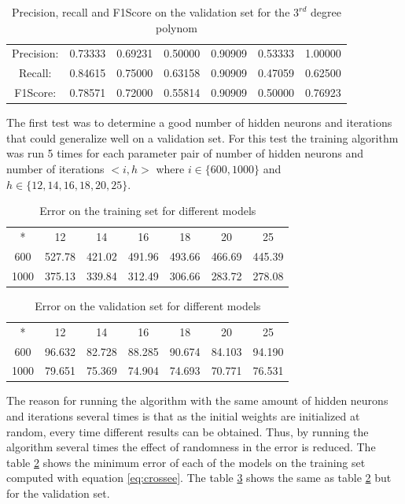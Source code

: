 \documentclass{IEEEtran}
\begin{document}
\begin{table}
\centering
\begin{tabular}{|c|c|c|c|c|c|c|}
\hline
Precision: & 0.73333 & 0.69231 & 0.50000 & 0.90909 & 0.53333 & 1.00000 \\
Recall: &  0.84615 & 0.75000 & 0.63158 & 0.90909 & 0.47059 & 0.62500 \\
F1Score: & 0.78571 & 0.72000 & 0.55814 & 0.90909 & 0.50000 & 0.76923 \\
\hline
\end{tabular}
\caption{Precision, recall and F1Score on the validation set for the $3^{rd}$ degree polynom}
\label{tb:tscoreslr}
\end{table}



The first test was to determine a good number of hidden neurons and iterations that could generalize well
on a validation set. For this test the training algorithm was run 5 times for each parameter pair of number
of hidden neurons and number of iterations $<i,h>$ where $i \in \{600,1000\}$ and $h \in \{12,14,16,18,20,25\}$.

\begin{table}
\centering
\begin{tabular}{|c|c|c|c|c|c|c|}
\hline
* & 12 & 14 & 16 & 18 & 20 & 25 \\
600 & 527.78 & 421.02 & 491.96 & 493.66 & 466.69 & 445.39 \\
1000 & 375.13 & 339.84 & 312.49 & 306.66 & 283.72 & 278.08 \\ 
\hline
\end{tabular}
\caption{Error on the training set for different models}
\label{tb:terror}
\end{table}

\begin{table}
\centering
\begin{tabular}{|c|c|c|c|c|c|c|}
\hline
* & 12 & 14 & 16 & 18 & 20 & 25 \\
600 & 96.632 & 82.728 & 88.285 & 90.674 & 84.103 & 94.190 \\
1000 & 79.651 & 75.369 & 74.904 & 74.693 & 70.771 & 76.531 \\ 
\hline
\end{tabular}
\caption{Error on the validation set for different models}
\label{tb:verror}
\end{table}

The reason for running the algorithm with the same amount of hidden neurons and iterations several times is
that as the initial weights are initialized at random, every time different results can be obtained. Thus,
by running the algorithm several times the effect of randomness in the error is reduced. The table
\ref{tb:terror} shows the minimum error of each of the models on the training set computed with equation \ref{eq:crossee}.
The table \ref{tb:verror} shows the same as table \ref{tb:terror} but for the validation set.
\end{document}
